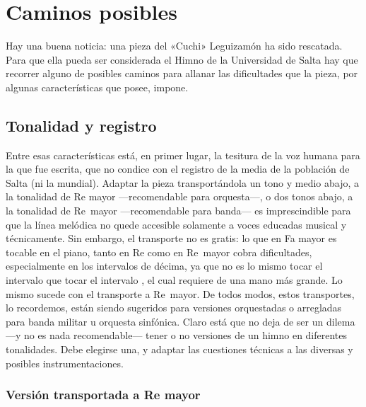 \chapter{Caminos posibles}
\label{cap:caminos}

Hay una buena noticia: una pieza del «Cuchi» Leguizamón ha sido rescatada. Para que ella pueda ser considerada el Himno de la Universidad de Salta hay que recorrer alguno de posibles caminos para allanar las dificultades que la pieza, por algunas características que posee, impone.

\section{Tonalidad y registro}
\label{sec:tonalidad-registro}

Entre esas características está, en primer lugar, la tesitura de la voz humana para la que fue escrita, que no condice con el registro de la media de la población de Salta (ni la mundial). Adaptar la pieza transportándola un tono y medio abajo, a la tonalidad de Re mayor ---recomendable para orquesta---, o dos tonos abajo, a la tonalidad de Re\bemoltxt\ mayor ---recomendable para banda--- es imprescindible para que la línea melódica no quede accesible solamente a voces educadas musical y técnicamente. Sin embargo, el transporte no es gratis: lo que en Fa mayor es tocable en el piano, tanto en Re como en Re\bemoltxt\ mayor cobra dificultades, especialmente en los intervalos de décima, ya que no es lo mismo tocar el intervalo  que tocar el intervalo \hbox{,} el cual requiere de una mano más grande. Lo mismo sucede con el transporte a Re\bemoltxt\ mayor. De todos modos, estos transportes, lo recordemos, están siendo sugeridos para versiones orquestadas o arregladas para banda militar u orquesta sinfónica. Claro está que no deja de ser un dilema ---y no es nada recomendable--- tener o no versiones de un himno en diferentes tonalidades. Debe elegirse una, y adaptar las cuestiones técnicas a las diversas y posibles instrumentaciones.

\subsection{Versión transportada a Re mayor}
\label{subsec:transporte-re}



